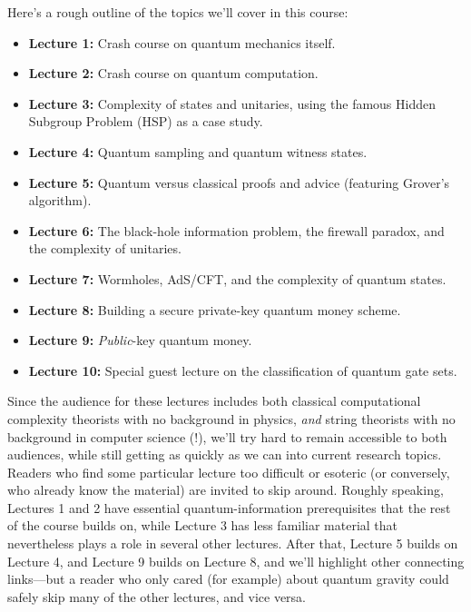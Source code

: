 \documentclass[11pt]{report}
\theoremstyle{plain}
\theoremstyle{definition}
\begin{document}
Here's a rough outline of the topics we'll cover in this course:
\begin{itemize}
    \item \textbf{Lecture 1:} Crash course on quantum mechanics itself.
    \item \textbf{Lecture 2:} Crash course on quantum computation.
    \item \textbf{Lecture 3:} Complexity of states and unitaries, using the famous Hidden Subgroup Problem (HSP) as a case study.
    \item \textbf{Lecture 4:} Quantum sampling and quantum witness states.
    \item \textbf{Lecture 5:} Quantum versus classical proofs and advice (featuring Grover's algorithm).
    \item \textbf{Lecture 6:} The black-hole information problem, the firewall paradox, and the complexity of unitaries.
    \item \textbf{Lecture 7:} Wormholes, AdS/CFT, and the complexity of quantum states.
    \item \textbf{Lecture 8:} Building a secure private-key quantum money scheme.
    \item \textbf{Lecture 9:} {\em Public}-key quantum money.
    \item \textbf{Lecture 10:} Special guest lecture on the classification of quantum gate sets.
\end{itemize}

Since the audience for these lectures includes both classical computational complexity theorists with no background in physics, {\em and} string theorists with no background in computer science (!), we'll try hard to remain accessible to both audiences, while still getting as quickly as we can into current research topics.  Readers who find some particular lecture too difficult or esoteric (or conversely, who already know the material) are invited to skip around.  Roughly speaking, Lectures 1 and 2 have essential quantum-information prerequisites that the rest of the course builds on, while Lecture 3 has less familiar material that nevertheless plays a role in several other lectures.  After that, Lecture 5 builds on Lecture 4, and Lecture 9 builds on Lecture 8, and we'll highlight other connecting links---but a reader who only cared (for example) about quantum gravity could safely skip many of the other lectures, and vice versa.
\end{document}
